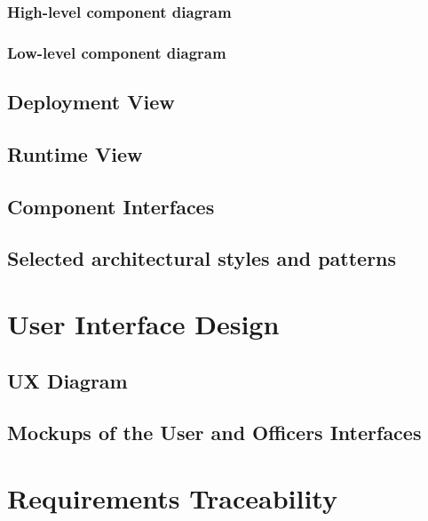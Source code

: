 \documentclass[12pt]{article}
\begin{document}
\subsubsection{High-level component diagram}

\clearpage
\subsubsection{Low-level component diagram}


\subsection{Deployment View}\label{deploymentview}

\subsection{Runtime View}\label{runtimeview}

\clearpage
\subsection{Component Interfaces}\label{componentinterfaces}

\subsection{Selected architectural styles and patterns}\label{archstyles}

\clearpage
\section{User Interface Design}
\subsection{UX Diagram}

\subsection{Mockups of the User and Officers Interfaces}

\clearpage
\section{Requirements Traceability}

\clearpage
\end{document}
